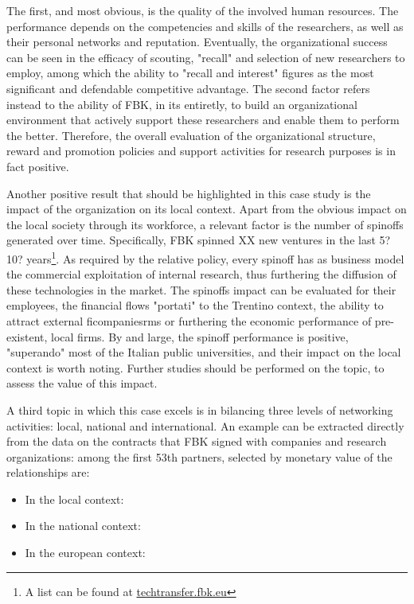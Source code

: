 The first, and most obvious, is the quality of the involved human resources. The performance depends on the competencies and skills of the researchers, as well as their personal networks and reputation. Eventually, the organizational success can be seen in the efficacy of scouting, "recall" and selection of new researchers to employ, among which the ability to "recall and interest" figures as the most significant and defendable competitive advantage. The second factor refers instead to the ability of FBK, in its entiretly, to build an organizational environment that actively support these researchers and enable them to perform the better. Therefore, the overall evaluation of the organizational structure, reward and promotion policies and support activities for research purposes is in fact positive.

Another positive result that should be highlighted in this case study is the impact of the organization on its local context. Apart from the obvious impact on the local society through its workforce, a relevant factor is the number of spinoffs generated over time. Specifically, FBK spinned XX new ventures in the last 5? 10? years\footnote{A list can be found at \hyperref[techtransfer.fbk.eu/spinoff]{techtransfer.fbk.eu}}. As required by the relative policy, every spinoff has as business model the commercial exploitation of internal research, thus furthering the diffusion of these technologies in the market. The spinoffs impact can be evaluated for their employees, the financial flows "portati" to the Trentino context, the ability to attract external ficompaniesrms or furthering the economic performance of pre-existent, local firms. By and large, the spinoff performance is positive, "superando" most of the Italian public universities, and their impact on the local context is worth noting. Further studies should be performed on the topic, to assess the value of this impact.

A third topic in which this case excels is in bilancing three levels of networking activities: local, national and international. An example can be extracted directly from the data on the contracts that FBK signed with companies and research organizations: among the first 53th partners, selected by monetary value of the relationships are:

\begin{itemize}

\item In the local context:

\item In the national context:

\item In the european context:

\end{itemize}

